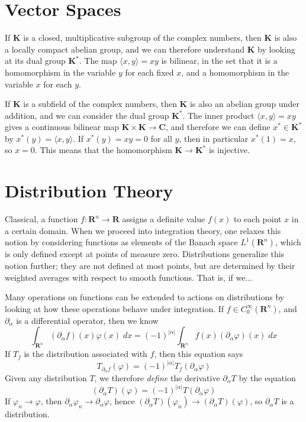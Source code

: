\chapter{Vector Spaces}

If $\mathbf{K}$ is a closed, multiplicative subgroup of the complex numbers, then $\mathbf{K}$ is also a locally compact abelian group, and we can therefore understand $\mathbf{K}$ by looking at its dual group $\mathbf{K}^*$. The map $\langle x,y \rangle = xy$ is bilinear, in the set that it is a homomorphism in the variable $y$ for each fixed $x$, and a homomorphism in the variable $x$ for each $y$.

If $\mathbf{K}$ is a subfield of the complex numbers, then $\mathbf{K}$ is also an abelian group under addition, and we can consider the dual group $\mathbf{K}^*$. The inner product $\langle x, y \rangle = xy$ gives a continuous bilinear map $\mathbf{K} \times \mathbf{K} \to \mathbf{C}$, and therefore we can define $x^* \in \mathbf{K}^*$ by $x^*(y) = \langle x,y \rangle$. If $x^*(y) = xy = 0$ for all $y$, then in particular $x^*(1) = x$, so $x = 0$. This means that the homomorphism $\mathbf{K} \to \mathbf{K}^*$ is injective.

\chapter{Distribution Theory}

Classical, a function $f: \mathbf{R}^n \to \mathbf{R}$ assigns a definite value $f(x)$ to each point $x$ in a certain domain. When we proceed into integration theory, one relaxes this notion by considering functions as elements of the Banach space $L^1(\mathbf{R}^n)$, which is only defined except at points of measure zero. Distributions generalize this notion further; they are not defined at most points, but are determined by their weighted averages with respect to smooth functions. That is, if we...

Many operations on functions can be extended to actions on distributions by looking at how these operations behave under integration. If $f \in C_0^\infty(\mathbf{R}^n)$, and $\partial_\alpha$ is a differential operator, then we know
%
\[ \int_{\mathbf{R}^n} (\partial_\alpha f)(x) \varphi(x)\; dx = (-1)^{|\alpha|} \int_{\mathbf{R}^n} f(x) (\partial_\alpha \varphi)(x)\; dx \]
%
If $T_f$ is the distribution associated with $f$, then this equation says
%
\[ T_{\partial_\alpha f}(\varphi) = (-1)^{|\alpha|} T_f(\partial_\alpha \varphi) \]
%
Given any distribution $T$, we therefore {\it define} the derivative $\partial_\alpha T$ by the equation
%
\[ (\partial_\alpha T)(\varphi) = (-1)^{|\alpha|} T(\partial_\alpha \varphi) \]
%
If $\varphi_n \to \varphi$, then $\partial_\alpha \varphi_n \to \partial_\alpha \varphi$, hence $(\partial_\alpha T)(\varphi_n) \to (\partial_\alpha T)(\varphi)$, so $\partial_\alpha T$ is a distribution.

